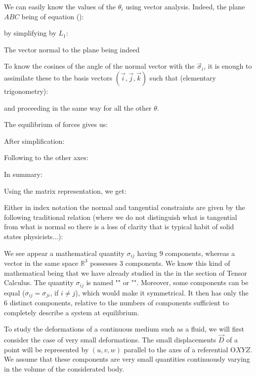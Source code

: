 	\begin{tcolorbox}[title=Remark,colframe=black,arc=10pt]
	We can easily know the values of the $\theta_i$ using vector analysis. Indeed, the plane $ABC$ being of equation ():
	
	by simplifying by $L_1$:
	
	The vector normal to the plane being indeed
	
	To know the cosines of the angle of the normal vector with the $\vec{\sigma}_i$, it is enough to assimilate these to the basis vectors $(\vec{i},\vec{j},\vec{k})$ such that (elementary trigonometry):
	
	and proceeding in the same way for all the other $\theta$.
	\end{tcolorbox}
	The equilibrium of forces gives us:
	
	After simplification:
	
	Following to the other axes:
	
	In summary:
	
	Using the matrix representation, we get:
	
	Either in index notation the normal and tangential constraints are given by the following traditional relation (where we do not distinguish what is tangential from what is normal so there is a loss of clarity that is typical habit of solid states physicists...):
	
	We see appear a mathematical quantity $\sigma_{ij}$ having $9$ components, whereas a vector in the same space $\mathbb{R}^3$ possesses $3$  components. We know this kind of mathematical being that we have already studied in the in the section of Tensor Calculus. The quantity $\sigma_{ij}$ is named "" or "". Moreover, some components can be equal ($\sigma_{ij}=\sigma_{ji}$, if $i\neq j$), which would make it symmetrical. It then has only the $6$ distinct components, relative to the numbers of components sufficient to completely describe a system at equilibrium.

	To study the deformations of a continuous medium such as a fluid, we will first consider the case of very small deformations. The small displacements $\vec{D}$ of a point will be represented by $(u, v, w)$ parallel to the axes of a referential O$XYZ$. We assume that these components are very small quantities continuously varying in the volume of the considerated body.

